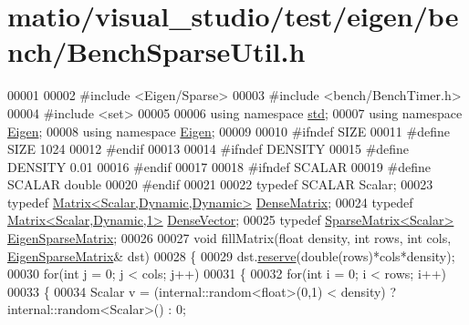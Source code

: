 \hypertarget{matio_2visual__studio_2test_2eigen_2bench_2_bench_sparse_util_8h_source}{}\section{matio/visual\+\_\+studio/test/eigen/bench/\+Bench\+Sparse\+Util.h}
\label{matio_2visual__studio_2test_2eigen_2bench_2_bench_sparse_util_8h_source}

\begin{DoxyCode}
00001 
00002 \textcolor{preprocessor}{#include <Eigen/Sparse>}
00003 \textcolor{preprocessor}{#include <bench/BenchTimer.h>}
00004 \textcolor{preprocessor}{#include <set>}
00005 
00006 \textcolor{keyword}{using namespace }\hyperlink{namespacestd}{std};
00007 \textcolor{keyword}{using namespace }\hyperlink{namespace_eigen}{Eigen};
00008 \textcolor{keyword}{using namespace }\hyperlink{namespace_eigen}{Eigen};
00009 
00010 \textcolor{preprocessor}{#ifndef SIZE}
00011 \textcolor{preprocessor}{#define SIZE 1024}
00012 \textcolor{preprocessor}{#endif}
00013 
00014 \textcolor{preprocessor}{#ifndef DENSITY}
00015 \textcolor{preprocessor}{#define DENSITY 0.01}
00016 \textcolor{preprocessor}{#endif}
00017 
00018 \textcolor{preprocessor}{#ifndef SCALAR}
00019 \textcolor{preprocessor}{#define SCALAR double}
00020 \textcolor{preprocessor}{#endif}
00021 
00022 \textcolor{keyword}{typedef} SCALAR Scalar;
00023 \textcolor{keyword}{typedef} \hyperlink{group___core___module}{Matrix<Scalar,Dynamic,Dynamic>} \hyperlink{group___core___module}{DenseMatrix};
00024 \textcolor{keyword}{typedef} \hyperlink{group___core___module}{Matrix<Scalar,Dynamic,1>} \hyperlink{group___core___module}{DenseVector};
00025 \textcolor{keyword}{typedef} \hyperlink{group___sparse_core___module}{SparseMatrix<Scalar>} \hyperlink{group___sparse_core___module}{EigenSparseMatrix};
00026 
00027 \textcolor{keywordtype}{void} fillMatrix(\textcolor{keywordtype}{float} density, \textcolor{keywordtype}{int} rows, \textcolor{keywordtype}{int} cols,  \hyperlink{group___sparse_core___module}{EigenSparseMatrix}& dst)
00028 \{
00029   dst.\hyperlink{group___sparse_core___module_a1518e58ac49bed0e2385b722a034f7d3}{reserve}(\textcolor{keywordtype}{double}(rows)*cols*density);
00030   \textcolor{keywordflow}{for}(\textcolor{keywordtype}{int} j = 0; j < cols; j++)
00031   \{
00032     \textcolor{keywordflow}{for}(\textcolor{keywordtype}{int} i = 0; i < rows; i++)
00033     \{
00034       Scalar v = (internal::random<float>(0,1) < density) ? internal::random<Scalar>() : 0;

\end{DoxyCode}
